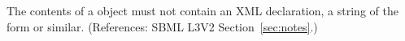 The contents of a \Notes object must not contain an XML declaration, \ie
a string of the form  or
similar.  (References: SBML L3V2 Section~\ref{sec:notes}.)

